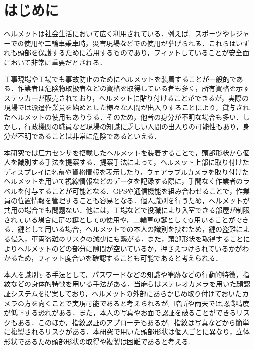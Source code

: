 \documentclass[Japanese,noauthor]{dicomopapers}
\begin{document}
\maketitle

\section{はじめに}
\label{introduction}
ヘルメットは社会生活において広く利用されている．例えば，スポーツやレジャーでの使用や二輪車乗車時，災害現場などでの使用が挙げられる．これらはいずれも頭部を保護するために着用するものであり，フィットしていることが安全面において非常に重要だとされる．\par

工事現場や工場でも事故防止のためにヘルメットを装着することが一般的である．作業者は危険物取扱者などの資格を取得している者も多く，所有資格を示すステッカーが販売されており，ヘルメットに貼り付けることができるが，実際の現場では派遣作業員を始めとした様々な人間が出入りすることにより，貸与されたヘルメットの使用もありうる．そのため，他者の身分が不明な場合も多い．しかし，行政機関の職員など現場の知識に乏しい人間の出入りの可能性もあり，身分が不明であることは非常に危険であるといえる．\par

本研究では圧力センサを搭載したヘルメットを装着することで，頭部形状から個人を識別する手法を提案する．提案手法によって，ヘルメット上部に取り付けたディスプレイに名前や資格情報を表示したり，ウェアラブルカメラを取り付けたヘルメットを用いて視線情報などのデータを記録する際に，手間なく作業者のラベルを付与することが可能となる．GPSや通信機能\cite{disaster}を組み合わせることで，作業員の位置情報を管理することも容易となる．個人識別を行うため，ヘルメットが共用の場合でも問題ない．他には，工場などで役職により入室できる部屋が制限されている場合に扉の鍵としての使用や，二輪車の鍵としても用いることができる．鍵として用いる場合，ヘルメットでの本人の識別を挟むため，鍵の盗難による侵入，車両盗難のリスクの減少にも繋がる．また，頭部形状を取得することによりヘルメットのどの部分に隙間が空いているか，押さえつけられているかがわかるため，フィット度合いを確認することも可能であると考えられる．\par

本人を識別する手法として，パスワードなどの知識や筆跡などの行動的特徴，指紋などの身体的特徴を用いる手法がある．当麻ら\cite{face}はステレオカメラを用いた顔認証システムを提案しており，ヘルメットの外部にあらかじめ取り付けておいたカメラの方を向くことで実現可能であると考えられるが，暗所や雨天では認識精度が低下する恐れがある．また，本人の写真やお面で認証を破ることができるリスクもある．このほか，指紋認証のアプローチもあるが，指紋は写真などから簡単に複製されるリスク\cite{finger_print}がある．本研究で用いた頭部形状は個人ごとに異なり，立体形状であるため頭部形状の取得や複製は困難であると考える．\par
\end{document}
